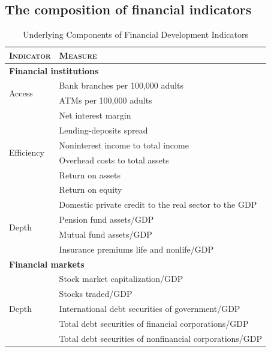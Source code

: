 \documentclass[preprint, nonatbib, 10pt]{elsarticle}
\begin{document}
\subsection*{The composition of financial indicators}
\label{ch4subsec:finind_comp}
\begin{table}[ht!]
    \small
    \caption{Underlying Components of Financial Development Indicators}
    \label{ch4tab:finind}
    \centering
    \begin{tabular}{ll}
      \toprule
      \textsc{Indicator} & \textsc{Measure} \\
      \midrule
      \multicolumn{2}{l}{\textbf{Financial institutions}} \\
      \midrule
      \multirow{2}{*}{Access} 	& Bank branches per 100,000 adults \\
                                  & ATMs per 100,000 adults \\
      \midrule
      \multirow{6}{*}{Efficiency}		& Net interest margin \\
                                  & Lending-deposits spread \\ 
                                  & Noninterest income to total income \\
                                  & Overhead costs to total assets \\
                                  & Return on assets \\
                                  & Return on equity \\
            
      \midrule
      \multirow{4}{*}{Depth}	& Domestic private credit to the real sector to the GDP \\
                                  & Pension fund assets/GDP \\
                                  & Mutual fund assets/GDP \\
                                  & Insurance premiums life and nonlife/GDP \\
      \midrule
      \multicolumn{2}{l}{\textbf{Financial markets}} \\
      \midrule
      \multirow{6}{*}{Depth} 	& Stock market capitalization/GDP \\
                                  & Stocks traded/GDP \\
                                  & International debt securities of government/GDP \\
                                  & Total debt securities of financial corporations/GDP \\
                                  & Total debt securities of nonfinancial corporations/GDP \\
      \bottomrule
    \end{tabular}
\end{table}
\end{document}
